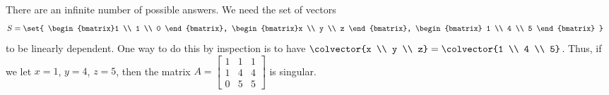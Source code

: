 There are an infinite number of possible answers. We need the set of vectors 
%
\begin{align*}
S &= 
\set{
\begin{bmatrix}1 \\ 1 \\ 0 \end{bmatrix}, 
\begin{bmatrix}x \\ y \\ z \end{bmatrix}, 
\begin{bmatrix} 1 \\ 4 \\ 5 \end{bmatrix}
}
\end{align*}
%
 to be linearly dependent.  One  way to do this  by inspection is to have 
$\colvector{x \\ y \\ z} =\colvector{1 \\ 4 \\ 5}$.  
Thus, if we let $x = 1$, $y = 4$, $ z = 5$, then the matrix 
$A = \begin{bmatrix} 1 & 1 & 1\\ 1 & 4 & 4 \\ 0 & 5 & 5 \end{bmatrix}$ is singular.

